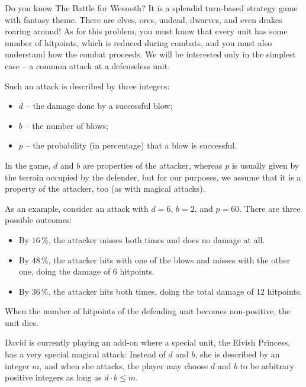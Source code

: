 

\usepackage{wrapfig}





Do you know The Battle for Wesnoth? It is a splendid turn-based strategy game with fantasy theme.
There are elves, orcs, undead, dwarves, and even drakes roaring around!
As for this problem, you must know that every unit has some number of hitpoints, which is reduced during combats,
and you must also understand how the combat proceeds. We will be interested only in the simplest case --
a common attack at a defenseless unit.

Such an attack is described by three integers:
\begin{itemize}
 \item $d$ -- the damage done by a successful blow;
 \item $b$ -- the number of blows;
 \item $p$ -- the probability (in percentage) that a blow is successful.
\end{itemize}
In the game, $d$ and $b$ are properties of the attacker, whereas $p$ is usually given by the terrain
occupied by the defender, but for our purposes, we assume that it is a property of the attacker, too
(as with magical attacks).

As an example, consider an attack with $d=6$, $b=2$, and $p=60$. There are three possible outcomes:
\begin{itemize}
 \item By $16\,\%$, the attacker misses both times and does no damage at all.
 \item By $48\,\%$, the attacker hits with one of the blows and misses with the other one,
 doing the damage of $6$ hitpoints.
 \item By $36\,\%$, the attacker hits both times, doing the total damage of $12$ hitpoints.
\end{itemize}
When the number of hitpoints of the defending unit becomes non-positive, the unit dies.

David is currently playing an add-on where a special unit, the Elvish Princess, has a very special magical attack:
Instead of $d$ and $b$, she is described by an integer $m$, and when she attacks, the player may choose
$d$ and $b$ to be arbitrary positive integers as long as $d\cdot b\leq m$.

